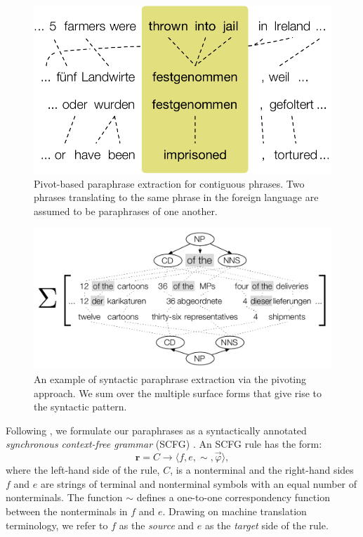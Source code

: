 \documentclass[11pt]{article}
\begin{document}
\begin{figure}[!t]
\begin{center}
\includegraphics[width=0.9\linewidth]{figures/phrasal_pivoting.pdf}
\end{center}
\caption{Pivot-based paraphrase extraction for contiguous phrases. Two
phrases translating to the same phrase in the foreign language are
assumed to be paraphrases of one another.}
\label{fig-example-compression}
\end{figure}


\begin{figure}[!t]
\begin{center}
\includegraphics[width=0.99\linewidth]{figures/syntactic_pivoting.pdf}
\end{center}
\caption{An example of syntactic paraphrase extraction via the
  pivoting approach. We sum over the multiple surface forms that give
  rise to the syntactic pattern.}\label{fig-syntactic-pivoting}
\end{figure}

Following , we formulate our paraphrases as
a syntactically annotated \emph{ synchronous context-free grammar}
(SCFG) \cite{Aho1972,Chiang2005}.  An SCFG rule has the form:
\begin{equation*}
  \mathbf{r} = C \rightarrow \langle f, e, \sim, \vec{\varphi} \rangle ,
\end{equation*}
where the left-hand side of the rule, $C$, is a nonterminal and the
right-hand sides $f$ and $e$ are strings of terminal and nonterminal
symbols with an equal number of nonterminals. The function $\sim$
defines a one-to-one correspondency function between the nonterminals
in $f$ and $e$. Drawing on machine translation terminology, we refer
to $f$ as the \emph{source} and $e$ as the \emph{target}
side of the rule.
\end{document}
